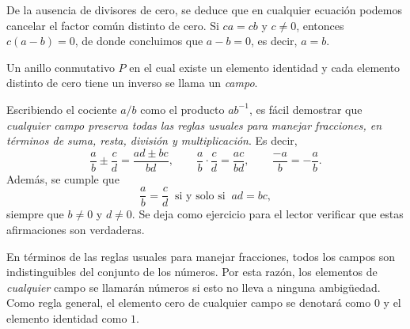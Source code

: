 De la ausencia de divisores de cero, se deduce que en cualquier ecuación podemos cancelar el factor común distinto de cero. Si $ca = cb$ y $c \neq 0$, entonces $c(a - b) = 0$, de donde concluimos que $a - b = 0$, es decir, $a = b$.

\begin{definicion}{}{}
    Un anillo conmutativo $P$ en el cual existe un elemento identidad y cada elemento distinto de cero tiene un inverso se llama un \emph{campo}.
\end{definicion}

Escribiendo el cociente $a / b$ como el producto $a b^{-1}$, es fácil demostrar que 
\emph{cualquier campo preserva todas las reglas usuales para manejar fracciones, en términos de suma, resta, división y multiplicación}. Es decir, 
$$\frac{a}{b} \pm \frac{c}{d} = \frac{ad \pm bc}{bd}, \qquad \frac{a}{b} \cdot \frac{c}{d} = \frac{ac}{bd}, \qquad \frac{-a}{b} = -\frac{a}{b}.$$
Además, se cumple que
$$\dfrac{a}{b} = \dfrac{c}{d} ~\text{ si y solo si }~ ad = bc,$$
siempre que $b \neq 0$ y $d \neq 0$. Se deja como ejercicio para el lector verificar que estas afirmaciones son verdaderas.

En términos de las reglas usuales para manejar fracciones, todos los campos son indistinguibles del conjunto de los números. Por esta razón, los elementos de \emph{cualquier} campo se llamarán números si esto no lleva a ninguna ambigüedad. Como regla general, el elemento cero de cualquier campo se denotará como $0$ y el elemento identidad como $1$.

